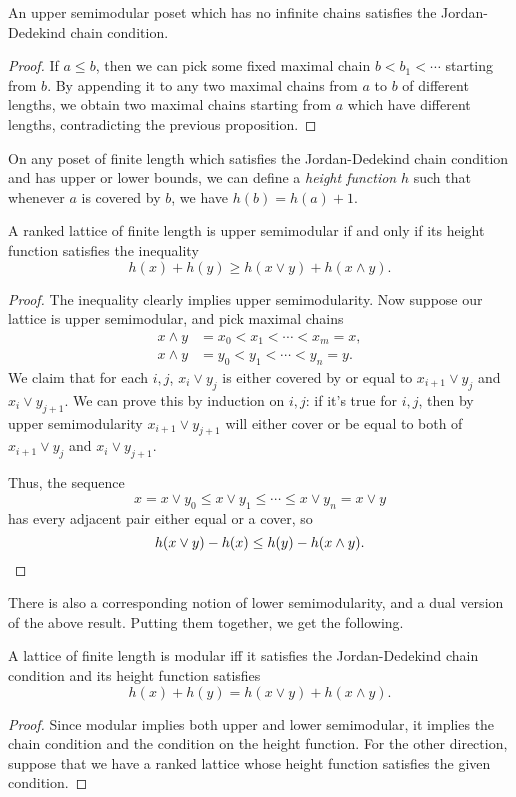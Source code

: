 \begin{appendices}
\begin{cor} An upper semimodular poset which has no infinite chains satisfies the Jordan-Dedekind chain condition.
\end{cor}
\begin{proof} If $a \le b$, then we can pick some fixed maximal chain $b < b_1 < \cdots$ starting from $b$. By appending it to any two maximal chains from $a$ to $b$ of different lengths, we obtain two maximal chains starting from $a$ which have different lengths, contradicting the previous proposition.
\end{proof}

On any poset of finite length which satisfies the Jordan-Dedekind chain condition and has upper or lower bounds, we can define a \emph{height function} $h$ such that whenever $a$ is covered by $b$, we have $h(b) = h(a)+1$.

\begin{prop} A ranked lattice of finite length is upper semimodular if and only if its height function satisfies the inequality
\[
h(x) + h(y) \ge h(x \vee y) + h(x \wedge y).
\]
\end{prop}
\begin{proof} The inequality clearly implies upper semimodularity. Now suppose our lattice is upper semimodular, and pick maximal chains
\begin{align*}
x\wedge y &= x_0 < x_1 < \cdots < x_m = x,\\
x\wedge y &= y_0 < y_1 < \cdots < y_n = y.
\end{align*}
We claim that for each $i,j$, $x_i \vee y_j$ is either covered by or equal to $x_{i+1} \vee y_j$ and $x_i \vee y_{j+1}$. We can prove this by induction on $i,j$: if it's true for $i,j$, then by upper semimodularity $x_{i+1} \vee y_{j+1}$ will either cover or be equal to both of $x_{i+1} \vee y_j$ and $x_i \vee y_{j+1}$.

Thus, the sequence
\[
x = x \vee y_0 \le x \vee y_1 \le \cdots \le x \vee y_n = x \vee y
\]
has every adjacent pair either equal or a cover, so
\[
h(x \vee y) - h(x) \le h(y) - h(x \wedge y).\qedhere
\]
\end{proof}

There is also a corresponding notion of lower semimodularity, and a dual version of the above result. Putting them together, we get the following.

\begin{thm} A lattice of finite length is modular iff it satisfies the Jordan-Dedekind chain condition and its height function satisfies
\[
h(x) + h(y) = h(x\vee y) + h(x \wedge y).
\]
\end{thm}
\begin{proof} Since modular implies both upper and lower semimodular, it implies the chain condition and the condition on the height function. For the other direction, suppose that we have a ranked lattice whose height function satisfies the given condition.


\end{proof}
\end{appendices}
